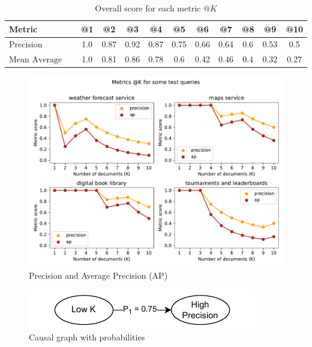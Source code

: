 \begin{table}[!h]
    \begin{center}
        \begin{tabular}{l c c c c c c c c c c}
            \hline
            \textbf{Metric} & \textbf{@1} & \textbf{@2} & \textbf{@3} & \textbf{@4} & \textbf{@5} & \textbf{@6} & \textbf{@7} & \textbf{@8} & \textbf{@9} & \textbf{@10} \\ \hline
            $\overline{\text{Precision}}$ & 1.0 & 0.87 & 0.92 & 0.87 & 0.75 & 0.66 & 0.64 & 0.6 & 0.53 & 0.5 \\
            $\text{Mean Average Precision}$ & 1.0 & 0.81 & 0.86 & 0.78 & 0.6 & 0.42 & 0.46 & 0.4 & 0.32 & 0.27 \\ \hline
        \end{tabular}
    \end{center}

    \caption{Overall score for each metric $@K$}
    \label{tab:metrics-pap}
\end{table}

\begin{figure}[!h]
    \begin{center}
        \includegraphics[width=0.8\linewidth]{assets/pdf/evaluation/ap}
    \end{center}

    \caption{Precision and Average Precision (AP)}
    \label{fig:ap}
\end{figure}

\begin{figure}[!h]
    \begin{center}
        \includegraphics[width=0.4\linewidth]{assets/pdf/evaluation/dag-prec}
    \end{center}

    \caption{Causal graph with probabilities}
    \label{fig:dag-prec}
\end{figure}

